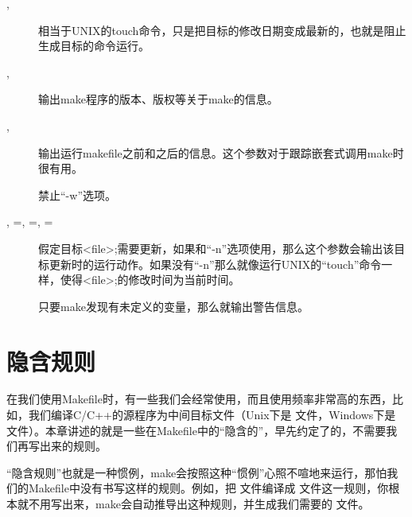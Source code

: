 \documentclass[a4paper,10pt]{sphinxmanual}
\begin{document}
\begin{description}
\item[{, }] \leavevmode
相当于UNIX的touch命令，只是把目标的修改日期变成最新的，也就是阻止生成目标的命令运行。

\item[{, }] \leavevmode
输出make程序的版本、版权等关于make的信息。

\item[{, }] \leavevmode
输出运行makefile之前和之后的信息。这个参数对于跟踪嵌套式调用make时很有用。

\item[{}] \leavevmode
禁止“-w”选项。

\item[{ , =, =, =}] \leavevmode
假定目标\textless{}file\textgreater{};需要更新，如果和“-n”选项使用，那么这个参数会输出该目标更新时的运行动作。如果没有“-n”那么就像运行UNIX的“touch”命令一样，使得\textless{}file\textgreater{};的修改时间为当前时间。

\item[{}] \leavevmode
只要make发现有未定义的变量，那么就输出警告信息。

\end{description}


\chapter{隐含规则}
\label{\detokenize{implicit_rules:id1}}\label{\detokenize{implicit_rules::doc}}
在我们使用Makefile时，有一些我们会经常使用，而且使用频率非常高的东西，比如，我们编译C/C++的源程序为中间目标文件（Unix下是  文件，Windows下是  文件）。本章讲述的就是一些在Makefile中的“隐含的”，早先约定了的，不需要我们再写出来的规则。

“隐含规则”也就是一种惯例，make会按照这种“惯例”心照不喧地来运行，那怕我们的Makefile中没有书写这样的规则。例如，把  文件编译成  文件这一规则，你根本就不用写出来，make会自动推导出这种规则，并生成我们需要的  文件。
\end{document}
